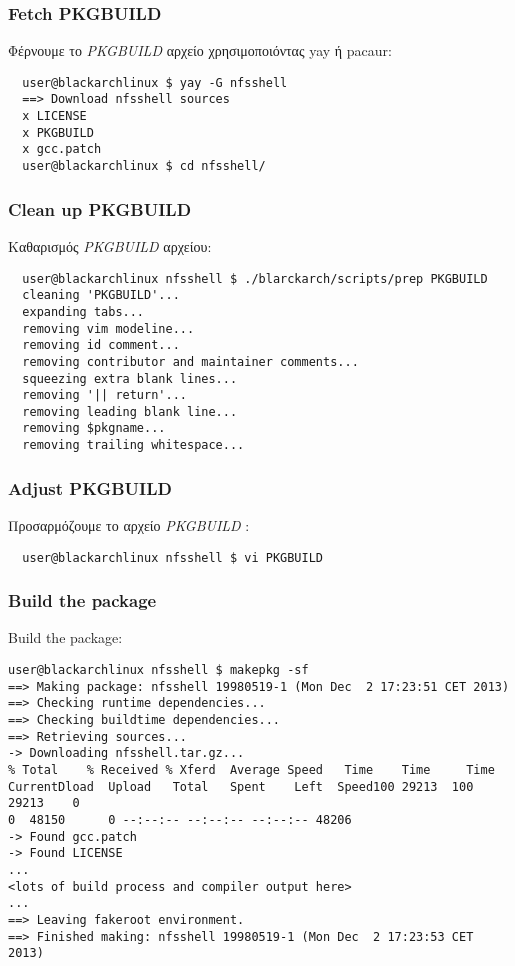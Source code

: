 \documentclass[a4paper, oneside, 11pt]{book}
\begin{document}
\subsubsection{Fetch PKGBUILD}
Φέρνουμε το \textit{PKGBUILD} αρχείο χρησιμοποιόντας yay ή pacaur:
\begin{lstlisting}
  user@blackarchlinux $ yay -G nfsshell
  ==> Download nfsshell sources
  x LICENSE
  x PKGBUILD
  x gcc.patch
  user@blackarchlinux $ cd nfsshell/
\end{lstlisting}

\subsubsection{Clean up PKGBUILD}
Καθαρισμός \textit{PKGBUILD} αρχείου:
\begin{lstlisting}
  user@blackarchlinux nfsshell $ ./blarckarch/scripts/prep PKGBUILD
  cleaning 'PKGBUILD'...
  expanding tabs...
  removing vim modeline...
  removing id comment...
  removing contributor and maintainer comments...
  squeezing extra blank lines...
  removing '|| return'...
  removing leading blank line...
  removing $pkgname...
  removing trailing whitespace...
\end{lstlisting}

\subsubsection{Adjust PKGBUILD}
Προσαρμόζουμε το αρχείο \textit{PKGBUILD} :
\begin{lstlisting}
  user@blackarchlinux nfsshell $ vi PKGBUILD
\end{lstlisting}

\subsubsection{Build the package}
Build the package:
\begin{lstlisting}user@blackarchlinux nfsshell $ makepkg -sf
==> Making package: nfsshell 19980519-1 (Mon Dec  2 17:23:51 CET 2013)
==> Checking runtime dependencies...
==> Checking buildtime dependencies...
==> Retrieving sources...
-> Downloading nfsshell.tar.gz...
% Total    % Received % Xferd  Average Speed   Time    Time     Time
CurrentDload  Upload   Total   Spent    Left  Speed100 29213  100 29213    0
0  48150      0 --:--:-- --:--:-- --:--:-- 48206
-> Found gcc.patch
-> Found LICENSE
...
<lots of build process and compiler output here>
...
==> Leaving fakeroot environment.
==> Finished making: nfsshell 19980519-1 (Mon Dec  2 17:23:53 CET 2013)
\end{lstlisting}
\end{document}
